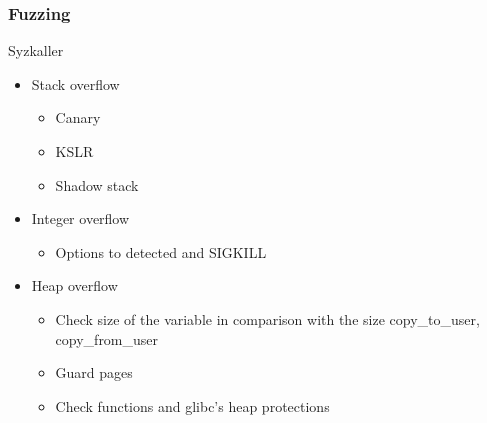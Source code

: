 \documentclass{beamer}
\begin{document}
\begin{frame}
    \frametitle{Fuzzing}
    \begin{beamerboxesrounded}{Syzkaller}
        \begin{itemize}
            \item Stack overflow
                  \begin{itemize}
                      \item Canary
                      \item KSLR
                      \item Shadow stack
                  \end{itemize}
            \item Integer overflow
                  \begin{itemize}
                      \item Options to detected and SIGKILL
                  \end{itemize}
            \item Heap overflow
                  \begin{itemize}
                      \item Check size of the variable in comparison with the size copy\_to\_user, copy\_from\_user
                      \item Guard pages
                      \item Check functions and glibc's heap protections
                  \end{itemize}
        \end{itemize}
    \end{beamerboxesrounded}
\end{frame}
\end{document}
